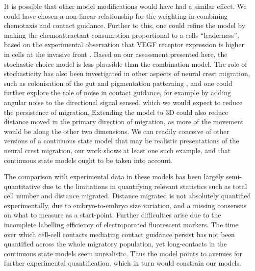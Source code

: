 \documentclass[review]{elsarticle}
\begin{document}

It is possible that other model modifications would have had a similar effect. We could have chosen a non-linear relationship for the weighting in combining chemotaxis and contact guidance. Further to this, one could refine the model by making the chemoattractant consumption proportional to a cells ``leaderness'', based on the experimental observation that VEGF receptor expression is higher in cells at the invasive front \cite{McLennan2015,Morrison2017}. Based on our assessment presented here, the stochastic choice model is less plausible than the combination model. The role of stochasticity has also been investigated in other aspects of neural crest migration, such as colonisation of the gut \cite{Binder2015,Smadbeck2015,Zhang2018} and pigmentation patterning \cite{Mort2016}, and one could further explore the role of noise in contact guidance, for example by adding angular noise to the directional signal sensed, which we would expect to reduce the persistence of migration. Extending the model to 3D could also reduce distance moved in the primary direction of migration, as more of the movement would be along the other two dimensions. We can readily conceive of other versions of a continuous state model that may be realistic presentations of the neural crest migration, our work shows at least one such example, and that continuous state models ought to be taken into account.

The comparison with experimental data in these models has been largely semi-quantitative due to the limitations in quantifying relevant statistics such as total cell number and distance migrated. Distance migrated is not absolutely quantified experimentally, due to embryo-to-embryo size variation, and a missing consensus on what to measure as a start-point. Further difficulties arise due to the incomplete labelling efficiency of electroporated fluorescent markers. The time over which cell-cell contacts mediating contact guidance persist has not been quantified across the whole migratory population, yet long-contacts in the continuous state models seem unrealistic. Thus the model points to avenues for further experimental quantification, which in turn would constrain our models. %
\end{document}
